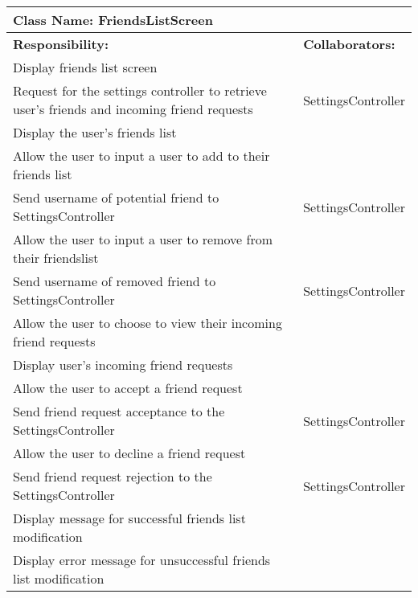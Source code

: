 \documentclass[english]{article}
\begin{document}
    \begin{table}[!ht]
        \centering
        \begin{tabular}{|p{8cm}|p{4cm}|}
        \hline 
        \multicolumn{2}{|l|}{\textbf{Class Name: FriendsListScreen}} \\
        \hline
        \textbf{Responsibility:} & \textbf{Collaborators:} \\
        \hline
        Display friends list screen &  \\
        \hline
        Request for the settings controller to retrieve user's friends and incoming friend requests & SettingsController\\
        \hline
        Display the user's friends list & \\
        \hline
        Allow the user to input a user to add to their friends list & \\
        \hline
        Send username of potential friend to SettingsController & SettingsController\\
        \hline
        Allow the user to input a user to remove from their friendslist & \\
        \hline
        Send username of removed friend to SettingsController & SettingsController\\
        \hline
        Allow the user to choose to view their incoming friend requests & \\
        \hline
        Display user's incoming friend requests & \\
        \hline
        Allow the user to accept a friend request & \\
        \hline
        Send friend request acceptance to the SettingsController & SettingsController\\
        \hline
        Allow the user to decline a friend request & \\
        \hline
        Send friend request rejection to the SettingsController & SettingsController\\
        \hline
        Display message for successful friends list modification & \\
        \hline
        Display error message for unsuccessful friends list modification & \\
        \hline
        \end{tabular}
    \end{table}
    
\end{document}
